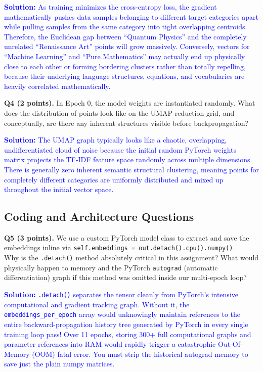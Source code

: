 \documentclass[11pt]{article}
\begin{document}
\textcolor{blue}{\textbf{Solution:} As training minimizes the cross-entropy loss, the gradient mathematically pushes data samples belonging to different target categories apart while pulling samples from the same category into tight overlapping centroids. Therefore, the Euclidean gap between ``Quantum Physics'' and the completely unrelated ``Renaissance Art'' points will grow massively. Conversely, vectors for ``Machine Learning'' and ``Pure Mathematics'' may actually end up physically close to each other or forming bordering clusters rather than totally repelling, because their underlying language structures, equations, and vocabularies are heavily correlated mathematically.}
\vspace{0.75cm}

\textbf{Q4 (2 points).} In Epoch 0, the model weights are instantiated randomly. What does the distribution of points look like on the UMAP reduction grid, and conceptually, are there any inherent structures visible before backpropagation?

\textcolor{blue}{\textbf{Solution:} The UMAP graph typically looks like a chaotic, overlapping, undifferentiated cloud of noise because the initial random PyTorch weights matrix projects the TF-IDF feature space randomly across multiple dimensions. There is generally zero inherent semantic structural clustering, meaning points for completely different categories are uniformly distributed and mixed up throughout the initial vector space.}
\vspace{0.75cm}

\subsection{Coding and Architecture Questions}

\textbf{Q5 (3 points).} We use a custom PyTorch model class to extract and save the embeddings inline via \texttt{self.embeddings = out.detach().cpu().numpy()}. \\
Why is the \texttt{.detach()} method absolutely critical in this assignment? What would physically happen to memory and the PyTorch \texttt{autograd} (automatic differentiation) graph if this method was omitted inside our multi-epoch loop?

\textcolor{blue}{\textbf{Solution:} \texttt{.detach()} separates the tensor cleanly from PyTorch's intensive computational and gradient tracking graph. Without it, the \texttt{embeddings\_per\_epoch} array would unknowingly maintain references to the entire backward-propagation history tree generated by PyTorch in every single training loop pass! Over 11 epochs, storing 300+ full computational graphs and parameter references into RAM would rapidly trigger a catastrophic Out-Of-Memory (OOM) fatal error. You must strip the historical autograd memory to save just the plain numpy matrices.}
\vspace{0.75cm}
\end{document}
